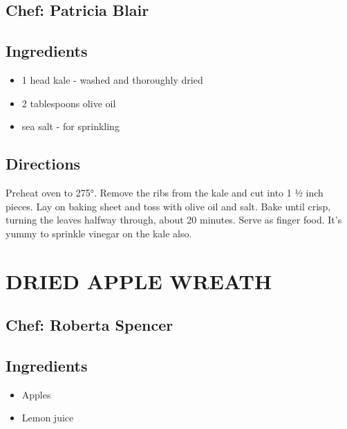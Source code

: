 \documentclass[
]{book}
\providecommand{\tightlist}{%
  \setlength{\itemsep}{0pt}\setlength{\parskip}{0pt}}
\begin{document}
\hypertarget{chef-patricia-blair-21}{%
\subsection*{Chef: Patricia Blair}\label{chef-patricia-blair-21}}


\hypertarget{ingredients-117}{%
\subsection*{Ingredients}\label{ingredients-117}}


\begin{itemize}
\tightlist
\item
  1 head kale - washed and thoroughly dried
\item
  2 tablespoons olive oil
\item
  sea salt - for sprinkling
\end{itemize}

\hypertarget{directions-117}{%
\subsection*{Directions}\label{directions-117}}


Preheat oven to 275°. Remove the ribs from the kale and cut into 1 ½ inch pieces. Lay on baking sheet and toss with olive oil and salt. Bake until crisp, turning the leaves halfway through, about 20 minutes. Serve as finger food. It's yummy to sprinkle vinegar on the kale also.

\hypertarget{dried-apple-wreath}{%
\section*{DRIED APPLE WREATH}\label{dried-apple-wreath}}


\hypertarget{chef-roberta-spencer-41}{%
\subsection*{Chef: Roberta Spencer}\label{chef-roberta-spencer-41}}


\hypertarget{ingredients-118}{%
\subsection*{Ingredients}\label{ingredients-118}}


\begin{itemize}
\tightlist
\item
  Apples
\item
  Lemon juice
\end{itemize}
\end{document}
